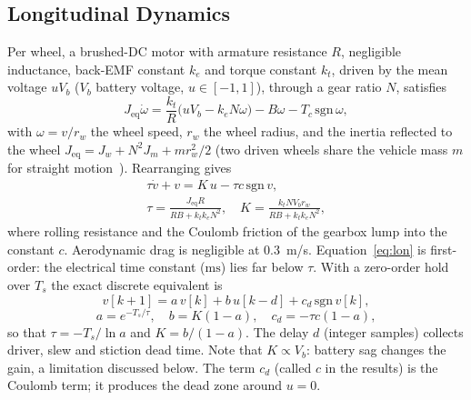 \documentclass[conference]{IEEEtran}\newcommand{\haveieee}{}%
\begin{document}
\subsection{Longitudinal Dynamics}
Per wheel, a brushed-DC motor with armature resistance $R$, negligible inductance, back-EMF constant $k_e$ and torque constant $k_t$, driven by the mean voltage $uV_b$ ($V_b$ battery voltage, $u\in[-1,1]$), through a gear ratio $N$, satisfies
\begin{equation}
J_\mathrm{eq}\dot\omega=\frac{k_t}{R}\Big(uV_b-k_eN\omega\Big)-B\omega-T_c\,\mathrm{sgn}\,\omega,
\label{eq:motor}
\end{equation}
with $\omega=v/r_w$ the wheel speed, $r_w$ the wheel radius, and the inertia reflected to the wheel $J_\mathrm{eq}=J_w+N^2J_m+m r_w^2/2$ (two driven wheels share the vehicle mass $m$ for straight motion~\cite{rajamani2011,gillespie1992}). Rearranging gives
\begin{equation}
\begin{gathered}\tau\dot v+v=K\,u-\tau c\,\mathrm{sgn}\,v,\\ \tau=\frac{J_\mathrm{eq}R}{R B+k_tk_eN^2},\quad K=\frac{k_t N V_b r_w}{RB+k_tk_eN^2},\end{gathered}
\label{eq:lon}
\end{equation}
where rolling resistance and the Coulomb friction of the gearbox lump into the constant $c$. Aerodynamic drag is negligible at 0.3~m/s. Equation~\eqref{eq:lon} is first-order: the electrical time constant ($\mathrm{ms}$) lies far below $\tau$. With a zero-order hold over $T_s$ the exact discrete equivalent is
\begin{equation}
v[k{+}1]=a\,v[k]+b\,u[k{-}d]+c_d\,\mathrm{sgn}\,v[k],
\label{eq:lond}
\end{equation}
\begin{equation}
a=e^{-T_s/\tau},\quad b=K(1-a),\quad c_d=-\tau c(1-a),
\label{eq:ab}
\end{equation}
so that $\tau=-T_s/\ln a$ and $K=b/(1-a)$. The delay $d$ (integer samples) collects driver, slew and stiction dead time. Note that $K\propto V_b$: battery sag changes the gain, a limitation discussed below. The term $c_d$ (called $c$ in the results) is the Coulomb term; it produces the dead zone around $u=0$.
\end{document}
